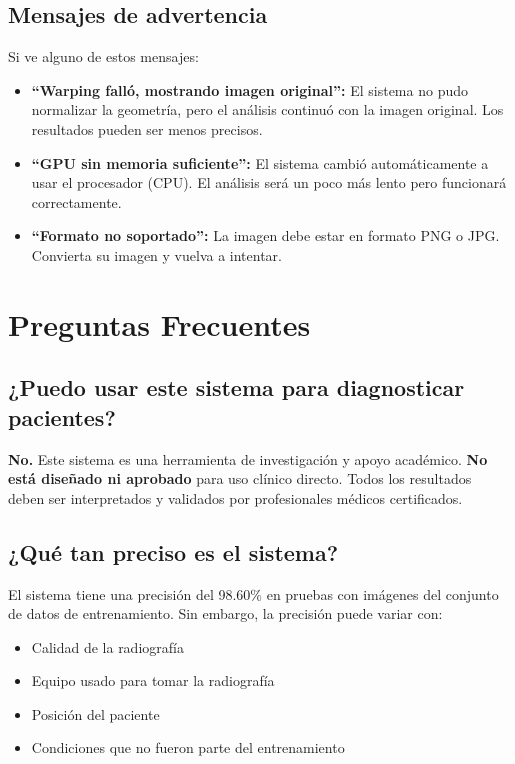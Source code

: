 \documentclass[12pt,a4paper]{article}
\begin{document}
\subsection{Mensajes de advertencia}

Si ve alguno de estos mensajes:

\begin{itemize}[leftmargin=*]
    \item \textbf{``Warping falló, mostrando imagen original'':} El sistema no pudo normalizar la geometría, pero el análisis continuó con la imagen original. Los resultados pueden ser menos precisos.

    \item \textbf{``GPU sin memoria suficiente'':} El sistema cambió automáticamente a usar el procesador (CPU). El análisis será un poco más lento pero funcionará correctamente.

    \item \textbf{``Formato no soportado'':} La imagen debe estar en formato PNG o JPG. Convierta su imagen y vuelva a intentar.
\end{itemize}

\newpage

\section{Preguntas Frecuentes}

\subsection{¿Puedo usar este sistema para diagnosticar pacientes?}

\textbf{No.} Este sistema es una herramienta de investigación y apoyo académico. \textbf{No está diseñado ni aprobado} para uso clínico directo. Todos los resultados deben ser interpretados y validados por profesionales médicos certificados.

\subsection{¿Qué tan preciso es el sistema?}

El sistema tiene una precisión del 98.60\% en pruebas con imágenes del conjunto de datos de entrenamiento. Sin embargo, la precisión puede variar con:
\begin{itemize}[leftmargin=*]
    \item Calidad de la radiografía
    \item Equipo usado para tomar la radiografía
    \item Posición del paciente
    \item Condiciones que no fueron parte del entrenamiento
\end{itemize}
\end{document}
